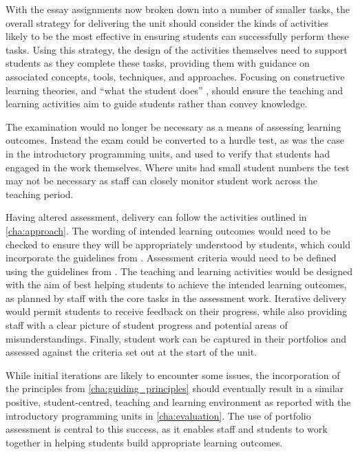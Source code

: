 With the essay assignments now broken down into a number of smaller tasks, the overall strategy for delivering the unit should consider the kinds of activities likely to be the most effective in ensuring students can successfully perform these tasks. Using this strategy, the design of the activities themselves need to support students as they complete these tasks, providing them with guidance on associated concepts, tools, techniques, and approaches. Focusing on constructive learning theories, and ``what the student does'' \cite{Biggs:2007}, should ensure the teaching and learning activities aim to guide students rather than convey knowledge. 

The examination would no longer be necessary as a means of assessing learning outcomes. Instead the exam could be converted to a hurdle test, as was the case in the introductory programming units, and used to verify that students had engaged in the work themselves. Where units had small student numbers the test may not be necessary as staff can closely monitor student work across the teaching period.

Having altered assessment, delivery can follow the activities outlined in \cref{cha:approach}. The wording of intended learning outcomes would need to be checked to ensure they will be appropriately understood by students, which could incorporate the guidelines from . Assessment criteria would need to be defined using the guidelines from . The teaching and learning activities would be designed with the aim of best helping students to achieve the intended learning outcomes, as planned by staff with the core tasks in the assessment work. Iterative delivery would permit students to receive feedback on their progress, while also providing staff with a clear picture of student progress and potential areas of misunderstandings. Finally, student work can be captured in their portfolios and assessed against the criteria set out at the start of the unit.

While initial iterations are likely to encounter some issues, the incorporation of the principles from \cref{cha:guiding_principles} should eventually result in a similar positive, student-centred, teaching and learning environment as reported with the introductory programming units in \cref{cha:evaluation}. The use of portfolio assessment is central to this success, as it enables staff and students to work together in helping students build appropriate learning outcomes. 

